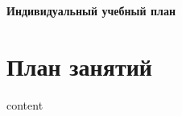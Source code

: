 \documentclass[12pt]{article}
\begin{document}
\begin{center}
{\LARGE\bfseries Индивидуальный учебный план}
\end{center}

\vspace{0.8em}

\section*{План занятий}
\begin{enumerate}
{{ content }}
\end{enumerate}
\end{document}
